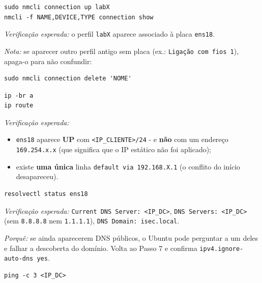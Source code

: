\begin{lstlisting}[style=bashstyle]
sudo nmcli connection up labX
nmcli -f NAME,DEVICE,TYPE connection show
\end{lstlisting}

\emph{Verificação esperada:} o perfil \texttt{labX} aparece associado à placa \texttt{ens18}.

\emph{Nota:} se aparecer outro perfil antigo sem placa (ex.: \texttt{Ligação com fios 1}), apaga-o para não confundir:

\begin{lstlisting}[style=bashstyle]
sudo nmcli connection delete 'NOME'
\end{lstlisting}


\begin{lstlisting}[style=bashstyle]
ip -br a
ip route
\end{lstlisting}

\emph{Verificação esperada:}

\begin{itemize}
\item \texttt{ens18} aparece \textbf{UP} com \texttt{\textless{}IP\_CLIENTE\textgreater{}/\allowbreak{}24} - e \textbf{não} com um endereço \texttt{169.254.x.x} (que significa que o IP estático não foi aplicado);
\item existe \textbf{uma única} linha \texttt{default via 192.168.X.1} (o conflito do início desapareceu).
\end{itemize}


\begin{lstlisting}[style=bashstyle]
resolvectl status ens18
\end{lstlisting}

\emph{Verificação esperada:} \texttt{Current DNS Server: \textless{}IP\_DC\textgreater{}}, \texttt{DNS Servers: \textless{}IP\_DC\textgreater{}} (sem \texttt{8.8.8.8} nem \texttt{1.1.1.1}), \texttt{DNS Domain: isec.local}.

\emph{Porquê:} se ainda aparecerem DNS públicos, o Ubuntu pode perguntar a um deles e falhar a descoberta do domínio. Volta ao Passo 7 e confirma \texttt{ipv4.ignore-auto-dns yes}.


\begin{lstlisting}[style=bashstyle]
ping -c 3 <IP_DC>
\end{lstlisting}


